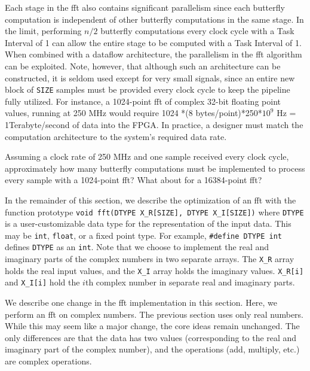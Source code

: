 Each stage in the \gls{fft} also contains significant parallelism since each butterfly computation is independent of other butterfly computations in the same stage.  In the limit, performing $n/2$ butterfly computations every clock cycle with a Task Interval of 1 can allow the entire stage to be computed with a Task Interval of 1.  When combined with a dataflow architecture, the parallelism in the \gls{fft} algorithm can be exploited.  Note, however, that although such an architecture can be constructed, it is seldom used except for very small signals, since an entire new block of \lstinline|SIZE| samples must be provided every clock cycle to keep the pipeline fully utilized.  For instance, a 1024-point \gls{fft} of complex 32-bit floating point values, running at 250 MHz would require 1024 *(8 {bytes}/{point})*250*$10^9$ Hz = 1Terabyte/second of data into the FPGA.   In practice, a designer must match the computation architecture to the system's required data rate.

\begin{exercise}
Assuming a clock rate of 250 MHz and one sample received every clock cycle, approximately how many butterfly computations must be implemented to process every sample with a 1024-point \gls{fft}?  What about for a 16384-point \gls{fft}?
\end{exercise}

In the remainder of this section, we describe the optimization of an \gls{fft} with the function prototype \lstinline|void fft(DTYPE X_R[SIZE], DTYPE X_I[SIZE])| where \lstinline|DTYPE| is a user-customizable data type for the representation of the input data. This may be \lstinline|int|, \lstinline|float|, or a fixed point type. For example, \lstinline|#define DTYPE int| defines \lstinline|DTYPE| as an \lstinline|int|. Note that we choose to implement the real and imaginary parts of the complex numbers in two separate arrays. The \lstinline|X_R| array holds the real input values, and the \lstinline|X_I| array holds the imaginary values. \lstinline|X_R[i]| and \lstinline|X_I[i]| hold the $i$th complex number in separate real and imaginary parts. 

\begin{aside}
We describe one change in the \gls{fft} implementation in this section. Here, we perform an \gls{fft} on complex numbers. The previous section uses only real numbers. While this may seem like a major change, the core ideas remain unchanged. The only differences are that the data has two values (corresponding to the real and imaginary part of the complex number), and the operations (add, multiply, etc.) are complex operations. 
\end{aside}

